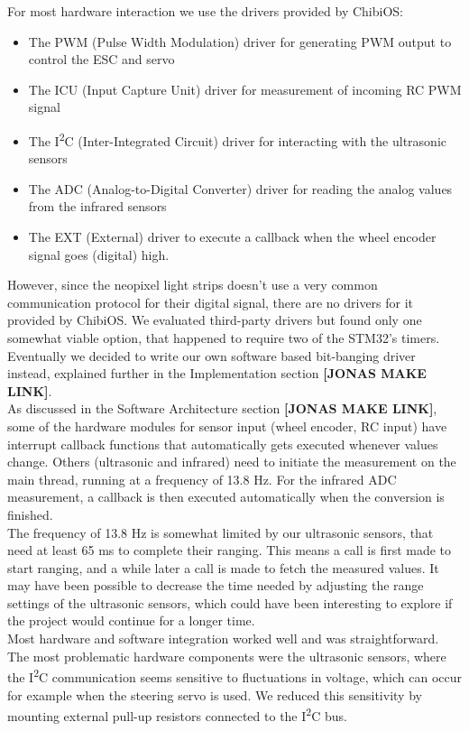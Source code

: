 \noindent
For most hardware interaction we use the drivers provided by ChibiOS:
\begin{itemize}
   \item The PWM (Pulse Width Modulation) driver for generating PWM output to
       control the ESC and servo
   \item The ICU (Input Capture Unit) driver for measurement of incoming RC PWM
       signal
   \item The I\textsuperscript{2}C (Inter-Integrated Circuit) driver for
       interacting with the ultrasonic sensors
   \item The ADC (Analog-to-Digital Converter) driver for reading the analog
       values from the infrared sensors
   \item The EXT (External) driver to execute a callback when the wheel encoder
       signal goes (digital) high.
\end{itemize}
However, since the neopixel light strips doesn’t use a very common communication
protocol for their digital signal, there are no drivers for it provided by
ChibiOS. We evaluated third-party drivers but found only one somewhat viable
option, that happened to require two of the STM32’s timers. Eventually we
decided to write our own software based bit-banging driver instead, explained
further in the Implementation section \textbf{[JONAS MAKE LINK]}.\\

\noindent
As discussed in the Software Architecture section \textbf{[JONAS MAKE LINK]},
some of the hardware modules for sensor input (wheel encoder, RC input) have
interrupt callback functions that automatically gets executed whenever values
change. Others (ultrasonic and infrared) need to initiate the measurement on the
main thread, running at a frequency of 13.8 Hz. For the infrared ADC
measurement, a callback is then executed automatically when the conversion is
finished.\\

\noindent
The frequency of 13.8 Hz is somewhat limited by our ultrasonic sensors, that
need at least 65 ms to complete their ranging. This means a call is first made
to start ranging, and a while later a call is made to fetch the measured values.
It may have been possible to decrease the time needed by adjusting the range
settings of the ultrasonic sensors, which could have been interesting to explore
if the project would continue for a longer time.\\

\noindent
Most hardware and software integration worked well and was straightforward. The
most problematic hardware components were the ultrasonic sensors, where the
I\textsuperscript{2}C communication seems sensitive to fluctuations in voltage,
which can occur for example when the steering servo is used. We reduced this
sensitivity by mounting external pull-up resistors connected to the
I\textsuperscript{2}C bus.\\


